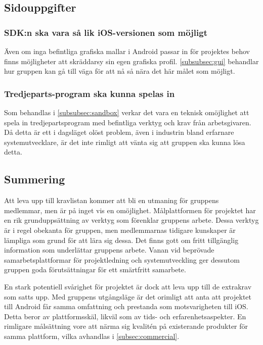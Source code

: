 \subsection{Sidouppgifter}
\subsubsection{SDK:n ska vara så lik iOS-versionen som möjligt}
Även om inga befintliga grafiska mallar i Android passar in för projektes behov finns möjligheter att skräddarsy sin egen grafiska profil. \ref{subsubsec:gui} behandlar hur gruppen kan gå till väga för att nå så nära det här målet som möjligt.

\subsubsection{Tredjeparts-program ska kunna spelas in}
Som behandlas i \ref{subsubsec:sandbox} verkar det vara en teknisk omöjlighet att spela in tredjepartsprogram med befintliga verktyg och krav från arbetsgivaren. Då detta är ett i dagsläget olöst problem, även i industrin bland erfarnare systemutvecklare, är det inte rimligt att vänta sig att gruppen ska kunna lösa detta.

\subsection{Summering}
Att leva upp till kravlistan kommer att bli en utmaning för gruppens medlemmar, men är på inget vis en omöjlighet. Målplattformen för projektet har en rik grunduppsättning av verktyg som förenklar gruppens arbete. Dessa verktyg är i regel obekanta för gruppen, men medlemmarnas tidigare kunskaper är lämpliga som grund för att lära sig dessa. Det finns gott om fritt tillgänglig information som underlättar gruppens arbete. Vanan vid beprövade samarbetsplattformar för projektledning och systemutveckling ger dessutom gruppen goda förutsättningar för ett smärtfritt samarbete.

En stark potentiell svårighet för projektet är dock att leva upp till de extrakrav som satts upp. Med gruppens utgångsläge är det orimligt att anta att projektet till Android får samma omfattning och prestanda som motsvarigheten till iOS. Detta beror av plattformsskäl, likväl som av tids- och erfarenhetsaspekter. En rimligare målsättning vore att närma sig kvalitén på existerande produkter för samma plattform, vilka avhandlas i \ref{subsec:commercial}.
